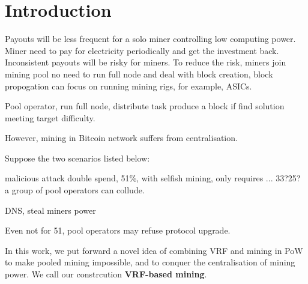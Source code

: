 \section{Introduction}




Payouts will be less frequent for a solo miner controlling low computing power.
Miner need to pay for electricity periodically and get the investment back.
Inconsistent payouts will be risky for miners.
To reduce the risk, miners join mining pool
no need to run full node and deal with block creation, block propogation
can focus on running mining rigs, for example, ASICs.

Pool operator, run full node, distribute task
produce a block if find solution meeting target difficulty.

However, mining in Bitcoin network suffers from centralisation.



Suppose the two scenarios listed below:



malicious attack
double spend, 51\%, with selfish mining, only requires ... 33?25?
a group of pool operators can collude.

DNS, steal miners power


Even not for 51, 
pool operators may refuse protocol upgrade. 


In this work, we put forward a novel idea of combining VRF and mining in PoW to make pooled mining impossible, and to conquer the centralisation of mining power.
We call our constrcution \textbf{VRF-based mining}.